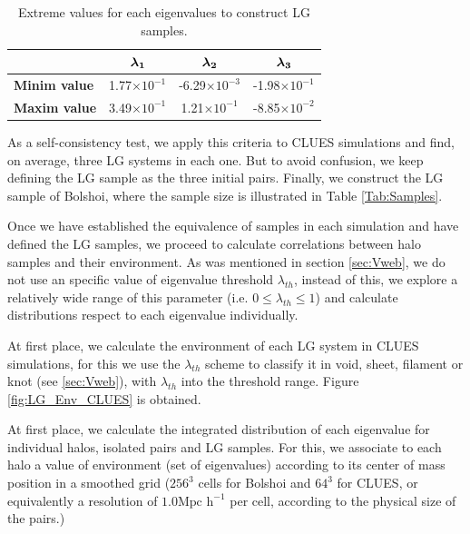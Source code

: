 \documentclass[usenatbib]{latex/mn2e}
\begin{document}
\begin{table}
  \centering
  \begin{tabular}{l | c c c} \hline
	& $\boldsymbol{ \lambda_{1} }$ & $\boldsymbol{ \lambda_{2} }$  & $\boldsymbol{ \lambda_{3} }$ \\ \hline
	\textbf{Minim value} & 1.77$\times 10^{-1}$ & -6.29$\times 10^{-3}$ & -1.98$\times 10^{-1}$ \\
	\textbf{Maxim value} & 3.49$\times 10^{-1}$ & 1.21$\times 10^{-1}$ & -8.85$\times 10^{-2}$ \\ \hline
  \end{tabular}
  
  \caption{Extreme values for each eigenvalues to construct LG samples.}
  
  \label{Tab:Lambdas_LG}
\end{table}


As a self-consistency test, we apply this criteria to CLUES simulations 
and find, on average, three LG systems in each one. But to avoid confusion, 
we keep defining the LG sample as the three initial pairs. Finally, we 
construct the LG sample of Bolshoi, where the sample size is illustrated 
in Table \ref{Tab:Samples}.


Once we have established the equivalence of samples in each simulation and 
have defined the LG samples, we proceed to calculate correlations between 
halo samples and their environment. As was mentioned in section 
\ref{sec:Vweb}, we do not use an specific value of eigenvalue threshold 
$\lambda_{th}$, instead of this, we explore a relatively wide range of 
this parameter (i.e. $0 \leq \lambda_{th} \leq 1$) and calculate 
distributions respect to each eigenvalue individually.


At first place, we calculate the environment of each LG system in CLUES 
simulations, for this we use the $\lambda_{th}$ scheme to classify it in 
void, sheet, filament or knot (see \ref{sec:Vweb}), with $\lambda_{th}$
into the threshold range. Figure \ref{fig:LG_Env_CLUES} is obtained.


At first place, we calculate the integrated distribution of each 
eigenvalue for individual halos, isolated pairs and LG samples. For this, 
we associate to each halo a value of environment (set of eigenvalues)
according to its center of mass position in a smoothed grid ($256^3$ 
cells for Bolshoi and $64^3$ for CLUES, or equivalently a resolution of 
$1.0 \mbox{Mpc h}^{-1} $ per cell, according to the physical size of the 
pairs.)
\end{document}
